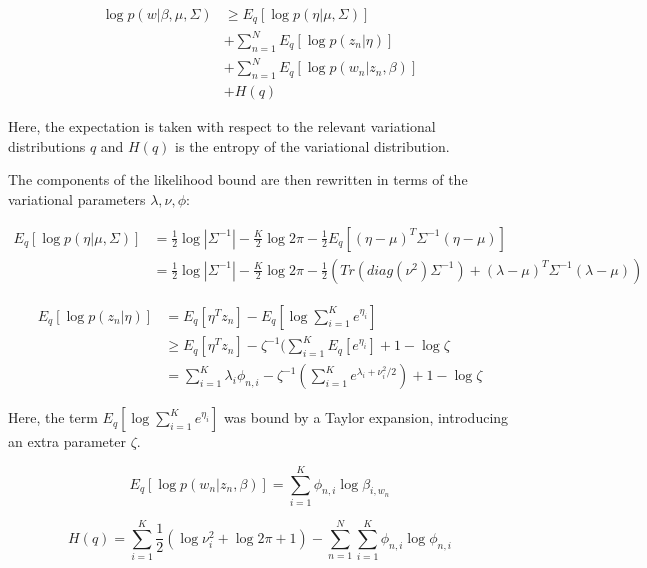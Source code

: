 \documentclass[12pt,a4paper,twoside,openright]{report}
\begin{document}
\begin{align}\label{eq:likelihood-bound}
\log p(w | \beta, \mu, \Sigma) & \geq E_q[\log p(\eta|\mu, \Sigma)] \\
& + \sum\limits_{n=1}^N E_q[\log p(z_n | \eta)] \\
& + \sum\limits_{n=1}^N E_q[\log p(w_n | z_n, \beta)] \\
& + \mathit{H}(q)
\end{align}

Here, the expectation is taken with respect to the relevant variational distributions $q$ and $\mathit{H}(q)$ is the entropy of the variational distribution.

The components of the likelihood bound are then rewritten in terms of the variational parameters $\lambda, \nu, \phi$:

\begin{align}
E_q[\log p(\eta|\mu, \Sigma)] & = \frac{1}{2} \log |\Sigma^{-1}| - \frac{K}{2} \log 2 \pi - \frac{1}{2}E_q[(\eta - \mu)^T\Sigma^{-1}(\eta - \mu)] \\ \label{eq:eta_mu_sigma}
& = \frac{1}{2} \log |\Sigma^{-1}| - \frac{K}{2} \log 2 \pi - \frac{1}{2}(\mathit{Tr}(\mathit{diag}(\nu^2)\Sigma^{-1}) + (\lambda - \mu)^T\Sigma^{-1}(\lambda - \mu))
\end{align}

\begin{align}
E_q[\log p(z_n | \eta)] & = E_q[\eta^Tz_n] - E_q[\log \sum\limits_{i=1}^K e^{\eta_i}] \\
& \geq E_q[\eta^Tz_n] - \zeta^{-1}(\sum\limits_{i=1}^KE_q[e^{\eta_i}] + 1 - \log\zeta \\
& = \sum\limits_{i=1}^K\lambda_i\phi_{n, i} - \zeta^{-1}(\sum\limits_{i=1}^Ke^{\lambda_i + \nu_i^2 / 2}) + 1 - \log\zeta
\end{align}

Here, the term $E_q[\log \sum\limits_{i=1}^K e^{\eta_i}]$ was bound by a Taylor expansion, introducing an extra parameter $\zeta$.

\begin{equation}
E_q[\log p(w_n | z_n, \beta)] = \sum\limits_{i=1}^K\phi_{n,i}\log\beta_{i, w_n}
\end{equation}

\begin{equation}
\mathit{H}(q) = \sum\limits_{i=1}^K\frac{1}{2}(\log\nu_i^2 + \log 2 \pi + 1) - \sum\limits_{n=1}^N\sum\limits_{i=1}^K\phi_{n,i}\log\phi_{n,i}
\end{equation}
\end{document}
